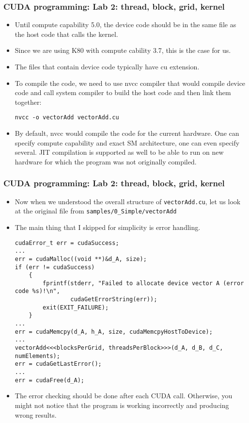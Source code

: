 \begin{frame}[fragile]
  \frametitle{CUDA programming: Lab 2: thread, block, grid, kernel}
\begin{itemize}
\item Until compute capability 5.0, the device code should be in the same file as the host code that calls the kernel.
\item Since we are using K80 with compute cability 3.7, this is the case for us.
\item The files that contain device code typically have {\color{mycolorcli}cu} extension.
\item To compile the code, we need to use {\color{mycolorcli}nvcc} compiler that would compile device code and call system compiler to build the host code and then link them together:
{\color{mycolorcli}
\begin{verbatim}
nvcc -o vectorAdd vectorAdd.cu
\end{verbatim}
}
\item By default, {\color{mycolorcli}nvcc} would compile the code for the current hardware. One can specify compute capability and exact SM architecture, one can even specify several. 
JIT compilation is supported as well to be able to run on new hardware for which the program was not originally compiled. 

\end{itemize}
\end{frame}


\begin{frame}[fragile]
  \frametitle{CUDA programming: Lab 2: thread, block, grid, kernel}
\begin{itemize}
\item Now when we understood the overall structure of {\color{mycolorcli}\verb|vectorAdd.cu|}, let us look at the original file from {\color{mycolorcli}\verb|samples/0_Simple/vectorAdd|}
\item The main thing that I skipped for simplicity is error handling.
{\tiny
{\color{mycolorcli}
\begin{verbatim}
cudaError_t err = cudaSuccess;
...
err = cudaMalloc((void **)&d_A, size);
if (err != cudaSuccess)
    {
        fprintf(stderr, "Failed to allocate device vector A (error code %s)!\n", 
                cudaGetErrorString(err));
        exit(EXIT_FAILURE);
    }
...
err = cudaMemcpy(d_A, h_A, size, cudaMemcpyHostToDevice);
...
vectorAdd<<<blocksPerGrid, threadsPerBlock>>>(d_A, d_B, d_C, numElements);
err = cudaGetLastError();
...
err = cudaFree(d_A);
\end{verbatim}
}
}
\item The error checking should be done after each CUDA call. Otherwise, you might not notice that the program is working incorrectly and producing wrong results.
\end{itemize}
\end{frame}
